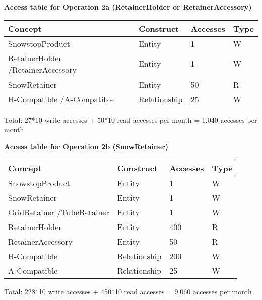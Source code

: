 {\vspace{12px}

{\centering \textbf{Access table for Operation 2a (RetainerHolder or RetainerAccessory)}\\}
\begin{table}[H]
  \def\arraystretch{1.10}%
  \centering
  \begin{tabular}{ | m{4cm} | m{4cm}| m{3cm} | m{2cm} |}
    \hline
    {\textbf{\large Concept}} & {\textbf{\large Construct}} & {\textbf{\large Accesses}} & {\textbf{\large Type}} \\
    \hline
    \color[HTML]{3531FF} SnowstopProduct & Entity & 1 & W \\
    \hline
    \color[HTML]{3531FF} RetainerHolder /\newline RetainerAccessory & Entity & 1 & W \\
    \hline
    \color[HTML]{3531FF} SnowRetainer & Entity & 50 & R \\
    \hline
    \color[HTML]{3531FF} H-Compatible /\newline A-Compatible & Relationship & 25 & W \\
    \hline
  \end{tabular}
\end{table}
Total: 27*10 write accesses + 50*10 read accesses per month = 1.040 accesses per month

\vspace{12px}

{\centering \textbf{Access table for Operation 2b (SnowRetainer)}\\}
\begin{table}[H]
  \def\arraystretch{1.10}%
  \centering
  \begin{tabular}{ | m{4cm} | m{4cm}| m{3cm} | m{2cm} |}
    \hline
    {\textbf{\large Concept}} & {\textbf{\large Construct}} & {\textbf{\large Accesses}} & {\textbf{\large Type}} \\
    \hline
    \color[HTML]{3531FF} SnowstopProduct & Entity & 1 & W \\
    \hline
    \color[HTML]{3531FF} SnowRetainer & Entity & 1 & W \\
    \hline
    \color[HTML]{3531FF} GridRetainer /\newline TubeRetainer & Entity & 1 & W \\
    \hline
    \color[HTML]{3531FF} RetainerHolder & Entity & 400 & R \\
    \hline
    \color[HTML]{3531FF} RetainerAccessory & Entity & 50 & R \\
    \hline
    \color[HTML]{3531FF} H-Compatible & Relationship & 200 & W \\
    \hline
    \color[HTML]{3531FF} A-Compatible & Relationship & 25 & W \\
    \hline
  \end{tabular}
\end{table}
Total: 228*10 write accesses + 450*10 read accesses = 9.060 accesses per month

}
